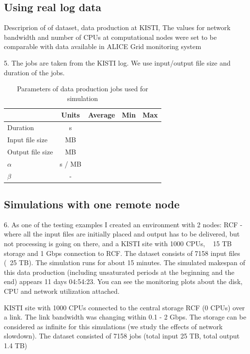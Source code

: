 \documentclass{svjour3}                     %
\begin{document}
\subsection{Using real log data}
Descriprion of of dataset, data production at KISTI,
The values for network bandwidth and number of CPUs at computational nodes were set to be comparable with data available in ALICE Grid monitoring system \cite{MonAlisa}

5. The jobs are taken from the KISTI log. We use input/output file size and duration of the jobs.


\begin{table}
\caption{Parameters of data production jobs used for simulation}
\label{tab:jobs}
\begin{center}
\begin{tabular}{ l  c  l  l  l  }
\hline \hline
    & Units& Average & Min & Max \\ \hline %
  Duration & s & & & \\ 
  Input file size & MB & & & \\	
  Output file size & MB & & & \\
  $\alpha$ & s / MB & & & \\
  $\beta$ & - & & & \\	
  \hline \hline
\end{tabular}
    \end{center}
\end{table}

\subsection{Simulations with one remote node}
6.  As one of the testing examples I created an environment with 2 nodes: RCF - where all the input files are initially placed and output has to be delivered, but not processing is going on there, and a KISTI site with 1000 CPUs, ~ 15 TB storage and 1 Gbps connection to RCF. The dataset consists of 7158 input files (~25 TB). The simulation runs for about 15 minutes. The simulated makespan of this data production (including unsaturated periods at the beginning and the end) appears 11 days 04:54:23. You can see the monitoring plots about the disk, CPU and network utilization attached. 

KISTI site with 1000 CPUs connected to the central storage RCF (0 CPUs) over a link. The link bandwidth was changing within 0.1 - 2 Gbps. The storage can be considered as infinite for this simulations (we study the effects of network slowdown). The dataset consisted of 7158 jobs  (total input 25 TB, total output 1.4 TB)
\end{document}
